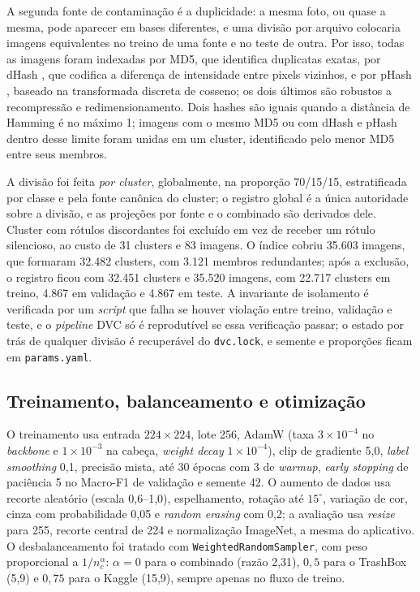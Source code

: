 \documentclass[11pt,a4paper]{article}
\begin{document}
	A segunda fonte de contaminação é a duplicidade: a mesma foto, ou quase a mesma, pode aparecer em bases diferentes, e uma divisão por arquivo colocaria imagens equivalentes no treino de uma fonte e no teste de outra. Por isso, todas as imagens foram indexadas por MD5, que identifica duplicatas exatas, por dHash \cite{krawetz2013}, que codifica a diferença de intensidade entre pixels vizinhos, e por pHash \cite{zauner2010}, baseado na transformada discreta de cosseno; os dois últimos são robustos a recompressão e redimensionamento. Dois hashes são iguais quando a distância de Hamming é no máximo 1; imagens com o mesmo MD5 ou com dHash e pHash dentro desse limite foram unidas em um cluster, identificado pelo menor MD5 entre seus membros.
	
	A divisão foi feita \emph{por cluster}, globalmente, na proporção 70/15/15, estratificada por classe e pela fonte canônica do cluster; o registro global é a única autoridade sobre a divisão, e as projeções por fonte e o combinado são derivados dele. Cluster com rótulos discordantes foi excluído em vez de receber um rótulo silencioso, ao custo de 31 clusters e 83 imagens. O índice cobriu 35.603 imagens, que formaram 32.482 clusters, com 3.121 membros redundantes; após a exclusão, o registro ficou com 32.451 clusters e 35.520 imagens, com 22.717 clusters em treino, 4.867 em validação e 4.867 em teste. A invariante de isolamento é verificada por um \textit{script} que falha se houver violação entre treino, validação e teste, e o \textit{pipeline} DVC só é reprodutível se essa verificação passar; o estado por trás de qualquer divisão é recuperável do \texttt{dvc.lock}, e semente e proporções ficam em \texttt{params.yaml}.
	
	\subsection{Treinamento, balanceamento e otimização}
	
	O treinamento usa entrada $224 \times 224$, lote 256, AdamW (taxa $3 \times 10^{-4}$ no \textit{backbone} e $1 \times 10^{-3}$ na cabeça, \textit{weight decay} $1 \times 10^{-4}$), clip de gradiente 5,0, \emph{label smoothing} 0,1, precisão mista, até 30 épocas com 3 de \emph{warmup}, \emph{early stopping} de paciência 5 no Macro-F1 de validação e semente 42. O aumento de dados usa recorte aleatório (escala 0,6--1,0), espelhamento, rotação até $15^\circ$, variação de cor, cinza com probabilidade 0,05 e \emph{random erasing} com 0,2; a avaliação usa \emph{resize} para 255, recorte central de 224 e normalização ImageNet, a mesma do aplicativo. O desbalanceamento foi tratado com \texttt{WeightedRandomSampler}, com peso proporcional a $1/n_c^{\alpha}$: $\alpha = 0$ para o combinado (razão 2,31), $0{,}5$ para o TrashBox (5,9) e $0{,}75$ para o Kaggle (15,9), sempre apenas no fluxo de treino.
	
\end{document}
